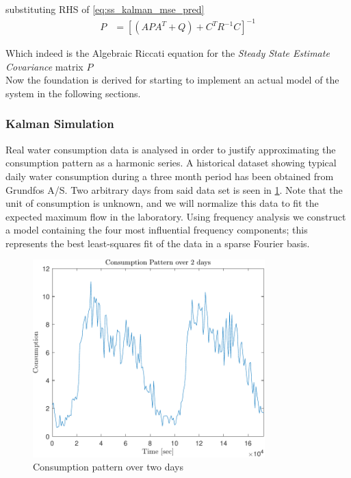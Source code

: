 substituting RHS of \cref{eq:ss_kalman_mse_pred}
\begin{align}
		P & = [({A}P{A}^T + {Q}) + {C}^T{R}^{-1}{C}]^{-1}  \label{eq:ss_kalman_udledning6}
\end{align}

Which indeed is the Algebraic Riccati equation for the \textit{Steady State Estimate Covariance} matrix $P$\\
Now the foundation is derived for starting to implement an actual model of the system in the following sections.

\subsubsection{Kalman Simulation}\label{sec:kalman_imp}
Real water consumption data is analysed in order to justify approximating the consumption pattern as a harmonic series. A historical dataset showing typical daily water consumption during a three month period has been obtained from Grundfos A/S. Two arbitrary days from said data set is seen in \cref{fig:Consumptionpattern}. Note that the unit of consumption is unknown, and we will normalize this data to fit the expected maximum flow in the laboratory.  Using frequency analysis we construct a model containing the four most influential frequency components; this represents the best least-squares fit of the data in a sparse Fourier basis.

\begin{figure}[h!]
	\centering
	\includegraphics[width=0.8\textwidth]{Pictures/ConsumptionPattern.pdf}
	
	\caption{Consumption pattern over two days}
	\label{fig:Consumptionpattern}
\end{figure}


